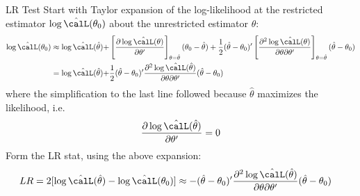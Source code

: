\documentclass[aspectratio=169, handout]{beamer}
\begin{document}
\begin{frame}{LR Test}
Start with Taylor expansion of the log-likelihood
at the restricted estimator $\log \hat{\calL}(\theta_0)$ about
the unrestricted estimator $\hat{\theta}$:
\begin{align*}
  \log \hat{\calL}(\theta_0)
  \approx
  \log \hat{\calL}(\hat{\theta})
  +
  &\left[
  \frac{%
    \partial\log \hat{\calL}(\theta)
  }{%
    \partial \theta'
  }
  \right]_{\theta=\hat{\theta}}
  (\theta_0-\hat{\theta})
  +
  \frac{1}{2}
  (\hat{\theta}-\theta_0)'
  \left[
  \frac{%
    \partial^2\log \hat{\calL}(\theta)
  }{%
    \partial \theta
    \partial \theta'
  }
  \right]_{\theta=\hat{\theta}}
  (\hat{\theta}-\theta_0)
  \\
  =
  \log \hat{\calL}(\hat{\theta})
  +
  &\frac{1}{2}
  (\hat{\theta}-\theta_0)'
  \frac{%
    \partial^2\log \hat{\calL}(\hat{\theta})
  }{%
    \partial \theta
    \partial \theta'
  }
  (\hat{\theta}-\theta_0)
\end{align*}
where the simplification to the last line followed because
$\hat{\theta}$ maximizes the likelihood, i.e.
\begin{align*}
  \frac{%
    \partial\log \hat{\calL}(\hat{\theta})
  }{%
    \partial \theta'
  }
  =
  0
\end{align*}
Form the LR stat, using the above expansion:
\begin{align*}
  LR
  =
  2[
    \log \hat{\calL}(\hat{\theta})
    -\log \hat{\calL}(\theta_0)
  ]
  &\approx
  -
  (\hat{\theta}-\theta_0)'
  \frac{%
    \partial^2\log \hat{\calL}(\hat{\theta})
  }{%
    \partial \theta
    \partial \theta'
  }
  (\hat{\theta}-\theta_0)
\end{align*}
\end{frame}
\end{document}
